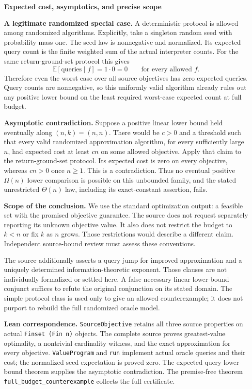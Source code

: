 \documentclass[11pt]{article}
\begin{document}
\newpage
\begin{center}
{\large\bfseries Expected cost, asymptotics, and precise scope}
\end{center}

\textbf{A legitimate randomized special case.} A deterministic protocol
is allowed among randomized algorithms. Explicitly, take a singleton
random seed with probability mass one. The seed law is nonnegative
and normalized. Its expected query count is the finite weighted sum
of the actual interpreter counts. For the same return-ground-set
protocol this gives
\[
 \mathbb E[\text{queries}\mid f]=1\cdot0=0
 \qquad\text{for every allowed }f.
\]
Therefore even the worst case over all source objectives has zero
expected queries. Query counts are nonnegative, so this uniformly
valid algorithm already rules out any positive lower bound on the
least required worst-case expected count at full budget.

\textbf{Asymptotic contradiction.} Suppose a positive linear lower
bound held eventually along \((n,k)=(n,n)\). There would be \(c>0\)
and a threshold such that every valid randomized approximation
algorithm, for every sufficiently large \(n\), had expected cost at
least \(cn\) on some allowed objective. Apply that claim to the
return-ground-set protocol. Its expected cost is zero on every
objective, whereas \(cn>0\) once \(n\geq1\). This is a contradiction.
Thus no eventual positive \(\Omega(n)\) lower comparison is possible
on this unbounded family, and the stated unrestricted
\(\Theta(n)\) law, including its exact-constant assertion, fails.

\textbf{Scope of the conclusion.} We use the standard optimization
output: a feasible set with the promised objective guarantee. The
source does not request separately reporting its unknown objective
value. It also does not restrict the budget to \(k<n\) or fix \(k\)
as \(n\) grows. Those restrictions would describe a different claim.
Independent source-bound review must assess these conventions.

The source additionally asserts a query jump for improved
approximation and a uniquely determined information-theoretic
exponent. Those clauses are not individually formalized or settled
here. A false necessary linear lower-bound conjunct suffices to
refute the original conjunction on its stated domain. The simple
protocol class is used only to give an allowed counterexample;
it does not purport to rebuild the full randomized oracle model.

\textbf{Lean correspondence.} \texttt{SourceObjective} retains all
three source properties on actual \texttt{Finset (Fin n)} objects.
The complete source proves greatest-value optimality, a nontrivial
cardinality witness, and the exact approximation for every objective.
\texttt{ValueProgram} and \texttt{run} implement actual oracle queries
and their cost; the normalized seed expectation is proved zero.
The expected-query lower-bound theorem supplies the asymptotic
contradiction. The premise-free theorem
\texttt{full\_budget\_counterexample} collects the full certificate.
\end{document}
